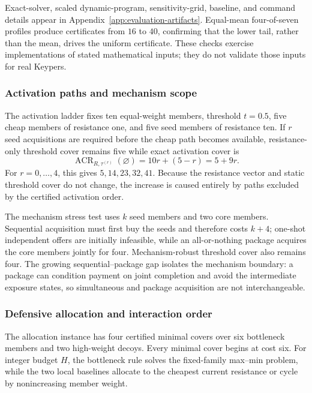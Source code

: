 Exact-solver, scaled dynamic-program, sensitivity-grid, baseline, and command
details appear in Appendix~\ref{app:evaluation-artifacts}. Equal-mean
four-of-seven profiles produce certificates from \(16\) to \(40\), confirming
that the lower tail, rather than the mean, drives the uniform certificate.
These checks exercise implementations of stated mathematical inputs; they do
not validate those inputs for real Keypers.

\subsubsection{Activation paths and mechanism scope}

The activation ladder fixes ten equal-weight members, threshold \(t=0.5\),
five cheap members of resistance one, and five seed members of resistance ten.
If \(r\) seed acquisitions are required before the cheap path becomes
available, resistance-only threshold cover remains five while exact activation
cover is
\[
    \operatorname{ACR}_{R,\tau^{(r)}}(\varnothing)
    =
    10r+(5-r)
    =
    5+9r.
\]
For \(r=0,\ldots,4\), this gives
\(5,14,23,32,41\). Because the resistance vector and static threshold cover do
not change, the increase is caused entirely by paths excluded by the certified
activation order.

The mechanism stress test uses \(k\) seed members and two core members.
Sequential acquisition must first buy the seeds and therefore costs \(k+4\);
one-shot independent offers are initially infeasible, while an all-or-nothing
package acquires the core members jointly for four. Mechanism-robust threshold
cover also remains four. The growing sequential--package gap isolates the
mechanism boundary: a package can condition payment on joint completion and
avoid the intermediate exposure states, so simultaneous and package
acquisition are not interchangeable.

\subsubsection{Defensive allocation and interaction order}

The allocation instance has four certified minimal covers over six bottleneck
members and two high-weight decoys. Every minimal cover begins at cost six.
For integer budget \(H\), the bottleneck rule solves the fixed-family max--min
problem, while the two local baselines allocate to the cheapest current
resistance or cycle by nonincreasing member weight.

